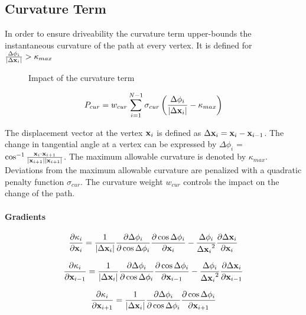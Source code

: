 \subsection{Curvature Term}
In order to ensure driveability the curvature term upper-bounds the instantaneous curvature of the path at every vertex. It is defined for $\frac{\Delta\phi_i}{|\Delta\mathbf{x}_i|} > \kappa_{max}$

\begin{figure}[h]
    \caption{Impact of the curvature term}
    \label{fig:curvatureTerm}
\end{figure}

\begin{equation}
P_{cur} = w_{cur} \displaystyle\sum_{i=1}^{N-1} \sigma_{cur}\left(\frac{\Delta\phi_i}{|\Delta\mathbf{x}_i|} - \kappa_{max}\right)
\end{equation}

The displacement vector at the vertex $\mathbf{x}_i$ is defined as $\Delta\mathbf{x}_i= \mathbf{x}_i - \mathbf{x}_{i-1}$. The change in tangential angle at a vertex can be expressed by $\Delta\phi_i$ = $\cos^{-1}\frac{\mathbf{x}_{i}\cdot\mathbf{x}_{i+1}}{|\mathbf{x}_{i+1}||\mathbf{x}_{i+1}| }$.  The maximum allowable curvature is denoted by $\kappa_{max}$. Deviations from the maximum allowable curvature are penalized with a quadratic penalty function $\sigma_{cur}$. The curvature weight $w_{cur}$  controls the impact on the change of the path.

\paragraph{Gradients}

\begin{equation}
\frac{\partial \kappa_i}{\partial \mathbf{x}_i} = \frac{1}{|\Delta\mathbf{x}_i|}\frac{\partial\Delta\phi_i}{\partial\cos\Delta\phi_i}\frac{\partial\cos\Delta\phi_i}{\partial\mathbf{x}_i}-\frac{\Delta\phi_i}{{\Delta\mathbf{x}_i}^2}\frac{\partial\Delta\mathbf{x}_i}{\partial\mathbf{x}_i}
\end{equation}

\begin{equation}
\frac{\partial \kappa_i}{\partial \mathbf{x}_{i-1}} = \frac{1}{|\Delta\mathbf{x}_i|}\frac{\partial\Delta\phi_i}{\partial\cos\Delta\phi_i}\frac{\partial\cos\Delta\phi_i}{\partial\mathbf{x}_{i-1}}-\frac{\Delta\phi_i}{{\Delta\mathbf{x}_i}^2}\frac{\partial\Delta\mathbf{x}_i}{\partial\mathbf{x}_{i-1}}
\end{equation}

\begin{equation}
\frac{\partial \kappa_i}{\partial \mathbf{x}_{i+1}} = \frac{1}{|\Delta\mathbf{x}_i|}\frac{\partial\Delta\phi_i}{\partial\cos\Delta\phi_i}\frac{\partial\cos\Delta\phi_i}{\partial\mathbf{x}_{i+1}}
\end{equation}

